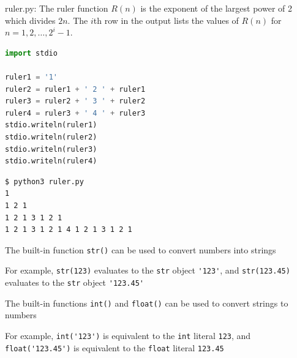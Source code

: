 \documentclass[8pt,a4paper,compress]{beamer}
\begin{document}
\begin{frame}[fragile]
\pause

\begin{framed}
\tiny ruler.py: The ruler function $R(n)$ is the exponent of the largest power of 2 which 
divides $2n$. The $i$th row in the output lists the values of $R(n)$ for $n=1,2,
\dots,2^i-1$.
\end{framed}

\begin{lstlisting}[language=Python]
import stdio

ruler1 = '1'
ruler2 = ruler1 + ' 2 ' + ruler1
ruler3 = ruler2 + ' 3 ' + ruler2
ruler4 = ruler3 + ' 4 ' + ruler3
stdio.writeln(ruler1)
stdio.writeln(ruler2)
stdio.writeln(ruler3)
stdio.writeln(ruler4)
\end{lstlisting}

\pause

\begin{lstlisting}[language={}]
$ python3 ruler.py 
1
1 2 1
1 2 1 3 1 2 1
1 2 1 3 1 2 1 4 1 2 1 3 1 2 1
\end{lstlisting}
\end{frame}

\begin{frame}[fragile]
\pause

The built-in function \lstinline{str()} can be used to convert numbers into strings

\pause
\bigskip

For example, \lstinline{str(123)} evaluates to the \lstinline{str} object \lstinline{'123'}, and \lstinline{str(123.45)} evaluates to the \lstinline{str} object \lstinline{'123.45'}

\pause
\bigskip

The built-in functions \lstinline{int()} and \lstinline{float()} can be used to convert strings to numbers

\pause
\bigskip

For example, \lstinline{int('123')} is equivalent to the \lstinline{int} literal \lstinline{123}, and \lstinline{float('123.45')} is equivalent to the \lstinline{float} literal \lstinline{123.45}
\end{frame}
\end{document}
